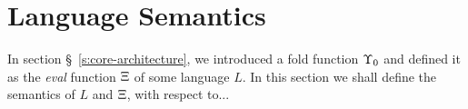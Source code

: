 \section{Language Semantics}

In section \S~\ref{s:core-architecture}, we introduced a fold function
$\Upsilon_0$ and defined it as the \emph{eval} function $\operatorname{\Xi}$ of some language
$L$. In this section we shall define the semantics of $L$ and $\operatorname{\Xi}$, with
respect to...

